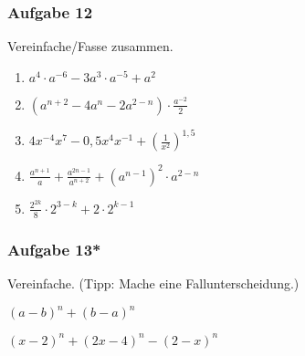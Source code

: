 \subsubsection{Aufgabe 12}
Vereinfache/Fasse zusammen.
\begin{enumerate}
	\item \quad $ a^4 \cdot a^{-6} - 3a^3 \cdot a^{-5} + a^2 $
	\item \quad $ (a^{n+2} - 4a^n - 2a^{2-n})\cdot \frac{a^{-2}}{2} $
	\item \quad $ 4x^{-4}x^7 - 0,5 x^4x^{-1} + \left(\frac{1}{x^2}\right)^{1,5} $
	\item \quad $ \frac{a^{n+1}}{a} + \frac{a^{2n-1}}{a^{n+2}} + (a^{n-1})^2 \cdot a^{2-n} $
	\item \quad $ \frac{2^{2k}}{8} \cdot 2^{3-k} + 2 \cdot 2^{k-1} $
\end{enumerate}

\newpage

\subsubsection{Aufgabe 13*}
Vereinfache. (Tipp: Mache eine Fallunterscheidung.)
\begin{enumerate}
\begin{multicols}{2}
	\item \quad $ (a-b)^n + (b-a)^n $
	\item \quad $ (x-2)^n + (2x-4)^n - (2-x)^n $
\end{multicols}
\end{enumerate}